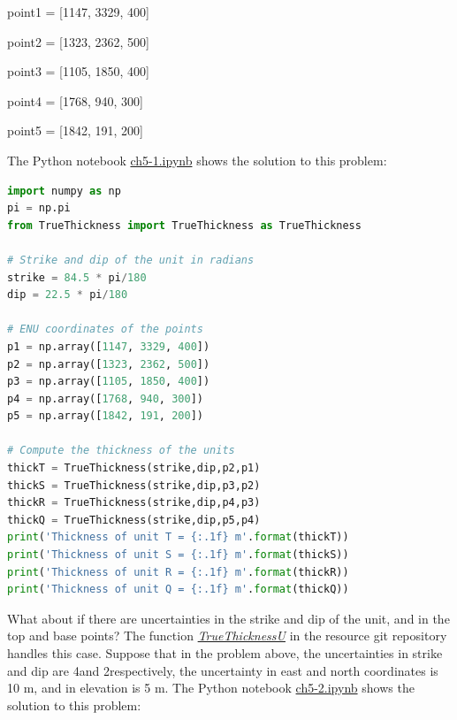 \documentclass[a4paper , 12pt]{book}
\begin{document}
point1 = [1147, 3329, 400]

point2 = [1323, 2362, 500]

point3 = [1105, 1850, 400]

point4 = [1768, 940, 300]

point5 = [1842, 191, 200]

The Python notebook \href{http://github.com}{ch5-1.ipynb} shows the solution to this problem:

\begin{center}
\begin{lstlisting}[language=Python, frame=single]
import numpy as np
pi = np.pi
from TrueThickness import TrueThickness as TrueThickness

# Strike and dip of the unit in radians
strike = 84.5 * pi/180
dip = 22.5 * pi/180

# ENU coordinates of the points
p1 = np.array([1147, 3329, 400]) 
p2 = np.array([1323, 2362, 500]) 
p3 = np.array([1105, 1850, 400]) 
p4 = np.array([1768, 940, 300]) 
p5 = np.array([1842, 191, 200])

# Compute the thickness of the units
thickT = TrueThickness(strike,dip,p2,p1)
thickS = TrueThickness(strike,dip,p3,p2)
thickR = TrueThickness(strike,dip,p4,p3)
thickQ = TrueThickness(strike,dip,p5,p4)
print('Thickness of unit T = {:.1f} m'.format(thickT))
print('Thickness of unit S = {:.1f} m'.format(thickS))
print('Thickness of unit R = {:.1f} m'.format(thickR))
print('Thickness of unit Q = {:.1f} m'.format(thickQ))
\end{lstlisting}
\end{center}

What about if there are uncertainties in the strike and dip of the unit, and in the top and base points? The function \href{http://github.com}{\textit{TrueThicknessU}} in the resource git repository handles this case. Suppose that in the problem above, the uncertainties in strike and dip are 4\degree and 2\degree respectively, the uncertainty in east and north coordinates is 10 m, and in elevation is 5 m. The Python notebook \href{http://github.com}{ch5-2.ipynb} shows the solution to this problem:
\end{document}

